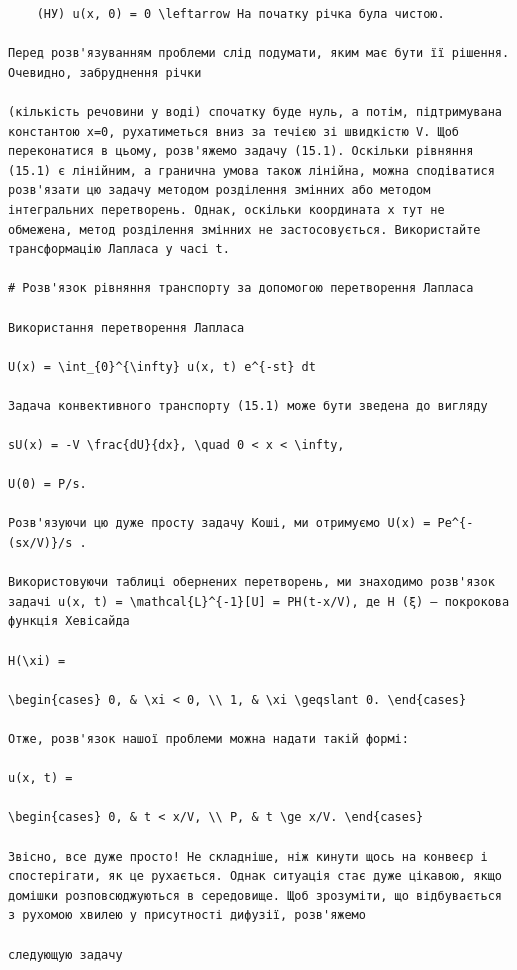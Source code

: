 \documentclass[
  ukrainian,
]{article}
\begin{document}
\begin{verbatim}
    (НУ) u(x, 0) = 0 \leftarrow На початку річка була чистою.

Перед розв'язуванням проблеми слід подумати, яким має бути її рішення. Очевидно, забруднення річки

(кількість речовини у воді) спочатку буде нуль, а потім, підтримувана константою x=0, рухатиметься вниз за течією зі швидкістю V. Щоб переконатися в цьому, розв'яжемо задачу (15.1). Оскільки рівняння (15.1) є лінійним, а гранична умова також лінійна, можна сподіватися розв'язати цю задачу методом розділення змінних або методом інтегральних перетворень. Однак, оскільки координата x тут не обмежена, метод розділення змінних не застосовується. Використайте трансформацію Лапласа у часі t.

# Розв'язок рівняння транспорту за допомогою перетворення Лапласа

Використання перетворення Лапласа

U(x) = \int_{0}^{\infty} u(x, t) e^{-st} dt

Задача конвективного транспорту (15.1) може бути зведена до вигляду

sU(x) = -V \frac{dU}{dx}, \quad 0 < x < \infty,

U(0) = P/s.

Розв'язуючи цю дуже просту задачу Коші, ми отримуємо U(x) = Pe^{-(sx/V)}/s .

Використовуючи таблиці обернених перетворень, ми знаходимо розв'язок задачі u(x, t) = \mathcal{L}^{-1}[U] = PH(t-x/V), де H (ξ) — покрокова функція Хевісайда

H(\xi) =

\begin{cases} 0, & \xi < 0, \\ 1, & \xi \geqslant 0. \end{cases}

Отже, розв'язок нашої проблеми можна надати такій формі:

u(x, t) =

\begin{cases} 0, & t < x/V, \\ P, & t \ge x/V. \end{cases}

Звісно, все дуже просто! Не складніше, ніж кинути щось на конвеєр і спостерігати, як це рухається. Однак ситуація стає дуже цікавою, якщо домішки розповсюджуються в середовище. Щоб зрозуміти, що відбувається з рухомою хвилею у присутності дифузії, розв'яжемо

следующую задачу


\end{verbatim}
\end{document}
